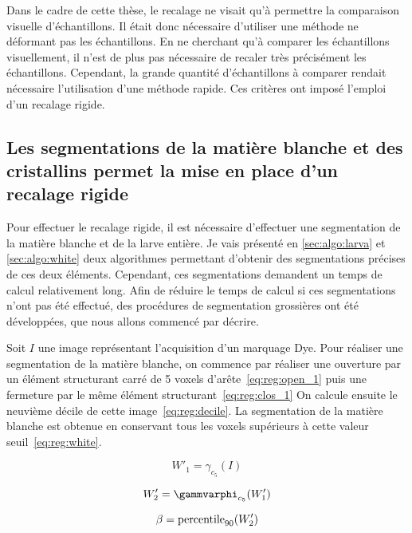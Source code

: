 \documentclass[\main/main.tex]{subfiles}
\begin{document}
%
Dans le cadre de cette thèse, le recalage ne visait qu'à permettre la comparaison visuelle d'échantillons.
%
Il était donc nécessaire d'utiliser une méthode ne déformant pas les échantillons.
%
En ne cherchant qu'à comparer les échantillons visuellement, il n'est de plus pas nécessaire de recaler très précisément les échantillons.
%
Cependant, la grande quantité d'échantillons à comparer rendait nécessaire l'utilisation d'une méthode rapide.
%
Ces critères ont imposé l'emploi d'un recalage rigide.

\subsection{Les segmentations de la matière blanche et des cristallins permet la mise en place d'un recalage rigide}

Pour effectuer le recalage rigide, il est nécessaire d'effectuer une segmentation de la matière blanche et de la larve entière.
%
Je vais présenté en \autoref{sec:algo:larva} et \autoref{sec:algo:white} deux algorithmes permettant d'obtenir des segmentations précises de ces deux éléments.
%
Cependant, ces segmentations demandent un temps de calcul relativement long.
%
Afin de réduire le temps de calcul si ces segmentations n'ont pas été effectué, des procédures de segmentation grossières ont été développées, que nous allons commencé par décrire.

%
Soit $I$ une image représentant l'acquisition d'un marquage Dye.
%
Pour réaliser une segmentation de la matière blanche, on commence par réaliser une ouverture par un élément structurant carré de 5 voxels d'arête~\eqref{eq:reg:open_1} puis une fermeture par le même élément structurant~\eqref{eq:reg:clos_1}
%
On calcule ensuite le neuvième décile de cette image~\eqref{eq:reg:decile}.
%
La segmentation de la matière blanche est obtenue en conservant tous les voxels supérieurs à cette valeur seuil~\eqref{eq:reg:white}.

\begin{equation}
    \label{eq:reg:open_1}
    W'_{1} = \gamma_{c_5}(I)
\end{equation}

\begin{equation}
    \label{eq:reg:clos_1}
    W'_{2} = \gammvarphi_{c_5}(W'_1)
\end{equation}

\begin{equation}
    \label{eq:reg:decile}
    \beta = \operatorname{\textnormal{percentile}}_{90}(W'_2)
\end{equation}
\end{document}
